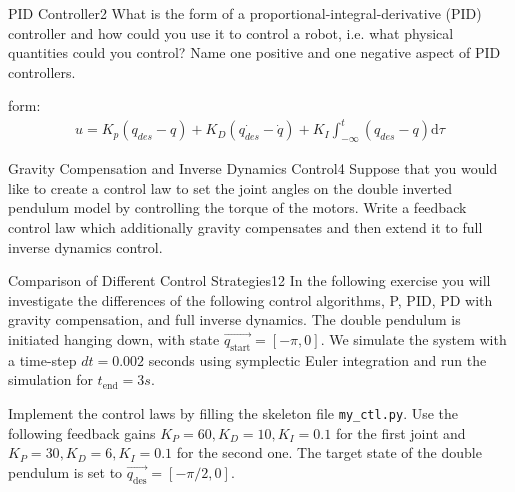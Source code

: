 \begin{questions}
	
	
	\begin{question}{PID Controller}{2}
		What is the form of a proportional-integral-derivative (PID) controller and how could you use it to control a robot, i.e. what physical quantities could you control? Name one positive and one negative aspect of PID controllers.
		
\begin{answer}
form: \begin{align*}
	u=K_{p} (q_{des} - q) + K_{D} (\dot{q_{des}} - \dot{q}) + K_{I} \int_{-\infty}^{t}(q_{des} - q)\textrm{d}\tau
\end{align*}
\end{answer}
		
	\end{question}
	
		
	\begin{question}{Gravity Compensation and Inverse Dynamics Control}{4}
		Suppose that you would like to create a control law to set the joint angles on the double inverted pendulum model by controlling the torque of the motors. Write a feedback control law which additionally gravity compensates and then extend it to full inverse dynamics control. 
		
\begin{answer}
\end{answer}
		
	\end{question}
	
	
	\begin{question}{Comparison of Different Control Strategies}{12}
		In the following exercise you will investigate the differences of the following control algorithms, P, PID, PD with gravity compensation, and full inverse dynamics.
		The double pendulum is initiated hanging down, with state $\vec{q_\textrm{start}}={[-\pi,0]}$. We simulate the system with a time-step $dt=0.002$ seconds using symplectic Euler integration and run the simulation for $t_\textrm{end}=3s$. 
		
		Implement the control laws by filling the skeleton file \texttt{my\_ctl.py}. Use the following feedback gains $K_P=60, K_D=10, K_I=0.1$ for the first joint and $K_P=30, K_D=6, K_I=0.1$ for the second one.
		The target state of the double pendulum is set to $\vec{q_\textrm{des}}={[-\pi / 2,0]}$. 
		

\end{question}
\end{questions}
